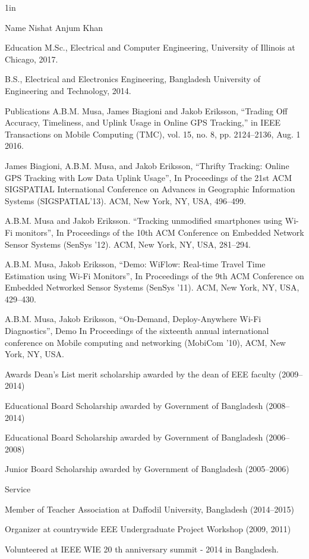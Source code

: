 \vita
\singlespace
\begin{list}
{}
{\setlength
   {}{1in}
    \setlength{\leftmargin}{0.8in}
    \setlength{\labelsep}{.2in}
    \setlength{\itemsep}{0.2in}
    \setlength{\rightmargin}{\leftmargin}}

\item[Name\hfill] Nishat Anjum Khan

\item[Education\hfill] M.Sc., Electrical and Computer Engineering, University of Illinois at Chicago, 2017.

B.S., Electrical and Electronics Engineering, Bangladesh University of Engineering and Technology, 2014.

\item[Publications\hfill] 
A.B.M. Musa, James Biagioni and Jakob Eriksson, “Trading Off Accuracy, Timeliness, and Uplink Usage in Online GPS Tracking,” in IEEE Transactions on Mobile Computing (TMC), vol. 15, no. 8, pp. 2124--2136, Aug. 1 2016.

James Biagioni, A.B.M. Musa, and Jakob Eriksson, “Thrifty Tracking: Online GPS Tracking with Low Data Uplink Usage”, In Proceedings of the 21st ACM SIGSPATIAL International Conference on Advances in Geographic Information Systems (SIGSPATIAL’13). ACM, New York, NY, USA, 496--499.

A.B.M. Musa and Jakob Eriksson. “Tracking unmodified smartphones using Wi-Fi monitors”, In Proceedings of the 10th ACM Conference on Embedded Network Sensor Systems (SenSys ’12). ACM, New York, NY, USA, 281--294.

A.B.M. Musa, Jakob Eriksson, “Demo: WiFlow: Real-time Travel Time Estimation using Wi-Fi Monitors”, In Proceedings of the 9th ACM Conference on Embedded Networked Sensor Systems (SenSys ’11). ACM, New York, NY, USA, 429--430.

A.B.M. Musa, Jakob Eriksson, “On-Demand, Deploy-Anywhere Wi-Fi Diagnostics”, Demo In Proceedings of the sixteenth annual international conference on Mobile computing and networking (MobiCom ’10), ACM, New York, NY, USA.


\item[Awards\hfill]
Dean’s List merit scholarship awarded by the dean of EEE faculty (2009--2014)

Educational Board Scholarship awarded by Government of Bangladesh (2008--2014)

Educational Board Scholarship awarded by Government of Bangladesh (2006--2008)

Junior Board Scholarship awarded by Government of Bangladesh (2005--2006)

\item[Service\hfill] 

Member of Teacher Association at Daffodil University, Bangladesh (2014--2015)

Organizer at countrywide EEE Undergraduate Project Workshop (2009, 2011)

Volunteered at IEEE WIE 20 th anniversary summit - 2014 in Bangladesh.

\end{list}

